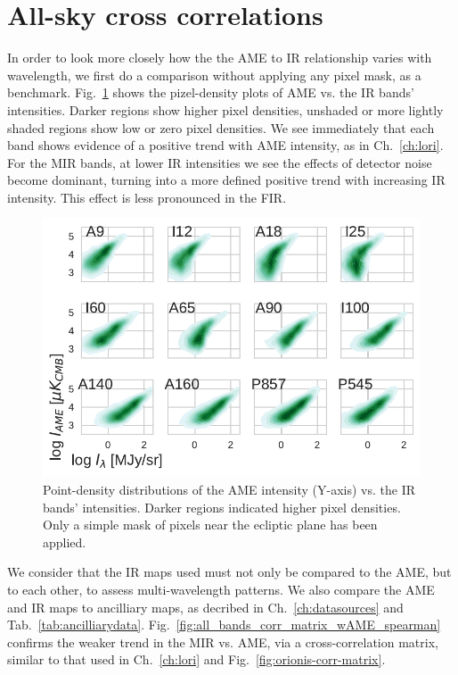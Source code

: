   \section{All-sky cross correlations}
        In order to look more closely how the the AME to IR relationship varies with wavelength, we first do a comparison without applying any pixel mask, as a benchmark. Fig.~\ref{fig:AMEvsDust_allsky_allbands_mpsub_kde_unmasked} shows the pizel-density plots of AME vs. the IR bands' intensities. Darker regions show higher pixel densities, unshaded or more lightly shaded regions show low or zero pixel densities. We see immediately that each band shows evidence of a positive trend with AME intensity, as in Ch.~\ref{ch:lori}. For the MIR bands, at lower IR intensities we see the effects of detector noise become dominant, turning into a more defined positive trend with increasing IR intensity. This effect is less pronounced in the FIR.
          \begin{figure}
            \includegraphics[width=\textwidth]{../Plots/ch_allsky/AMEvsDust_allsky_allbands_mpsub_kde_unmasked.pdf}
            \centering
            \caption{Point-density distributions of the AME intensity (Y-axis) vs. the IR bands' intensities. Darker regions indicated higher pixel densities. Only a simple mask of pixels near the ecliptic plane has been applied.}
            \label{fig:AMEvsDust_allsky_allbands_mpsub_kde_unmasked}
          \end{figure}
        We consider that the IR maps used must not only be compared to the AME, but to each other, to assess multi-wavelength patterns. We also compare the AME and IR maps to ancilliary maps, as decribed in Ch.~\ref{ch:datasources} and Tab.~\ref{tab:ancilliarydata}. Fig.~\ref{fig:all_bands_corr_matrix_wAME_spearman} confirms the weaker trend in the MIR vs. AME, via a cross-correlation matrix, similar to that used in Ch.~\ref{ch:lori} and Fig.~\ref{fig:orionis-corr-matrix}.
